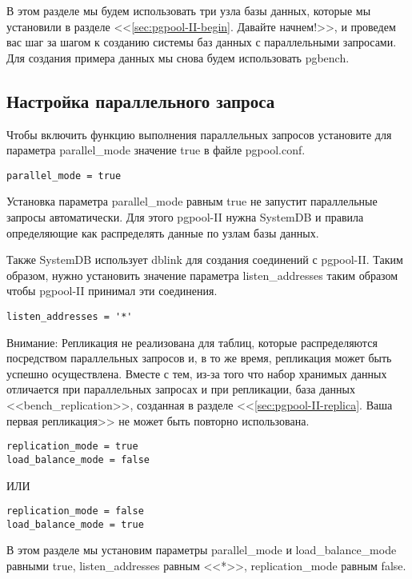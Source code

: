 В этом разделе мы будем использовать три узла базы данных, которые мы установили в разделе <<\ref{sec:pgpool-II-begin}. 
Давайте начнем!>>, и проведем вас шаг за шагом к созданию системы баз данных с параллельными запросами. 
Для создания примера данных мы снова будем использовать pgbench.

\subsection{Настройка параллельного запроса}
Чтобы включить функцию выполнения параллельных запросов установите для параметра parallel\_mode значение true в файле pgpool.conf.
\begin{verbatim}
parallel_mode = true
\end{verbatim}

Установка параметра parallel\_mode равным true не запустит параллельные запросы автоматически. 
Для этого pgpool-II нужна SystemDB и правила определяющие как распределять данные по узлам базы данных.

Также SystemDB использует dblink для создания соединений с pgpool-II. Таким образом, нужно установить значение 
параметра listen\_addresses таким образом чтобы pgpool-II принимал эти соединения.
\begin{verbatim}
listen_addresses = '*'
\end{verbatim}

Внимание: Репликация не реализована для таблиц, которые распределяются посредством параллельных запросов и, 
в то же время, репликация может быть успешно осуществлена. Вместе с тем, из-за того что набор хранимых данных 
отличается при параллельных запросах и при репликации, база данных <<bench\_replication>>, созданная в разделе
<<\ref{sec:pgpool-II-replica}. Ваша первая репликация>> не может быть повторно использована.
\begin{verbatim}
replication_mode = true
load_balance_mode = false
\end{verbatim}
ИЛИ
\begin{verbatim}
replication_mode = false
load_balance_mode = true
\end{verbatim}

В этом разделе мы установим параметры parallel\_mode и load\_balance\_mode равными true, 
listen\_addresses равным <<*>>, replication\_mode равным false.


